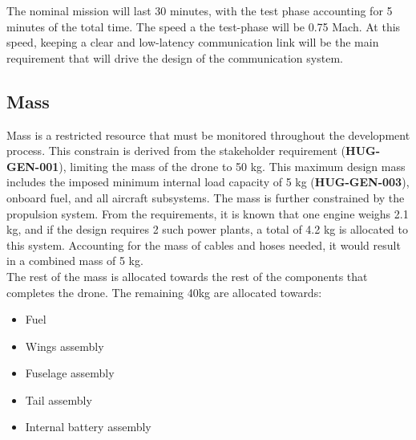 The nominal mission will last 30 minutes, with the test phase accounting for 5 minutes of the total time. The speed a the test-phase will be 0.75 Mach. At this speed, keeping a clear and low-latency communication link will be the main requirement that will drive the design of the communication system.




\subsection{Mass}
Mass is a restricted resource that must be monitored throughout the development process. This constrain is derived from the stakeholder requirement (\textbf{HUG-GEN-001}), limiting the mass of the drone to 50 kg. This maximum design mass includes the imposed minimum internal load capacity of 5 kg (\textbf{HUG-GEN-003}), onboard fuel, and all aircraft subsystems.
The mass is further constrained by the propulsion system. From the requirements, it is known that one engine weighs 2.1 kg, and if the design requires 2 such power plants, a total of 4.2 kg is allocated to this system. Accounting for the mass of cables and hoses needed, it would result in a combined mass of 5 kg.\\
The rest of the mass is allocated towards the rest of the components that completes the drone. The remaining 40kg are allocated towards:




\begin{itemize}
    \item Fuel 
    \item Wings assembly
    \item Fuselage assembly
    \item Tail assembly
    \item Internal battery assembly
\end{itemize}

